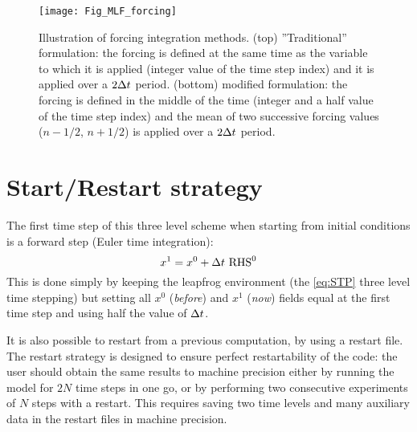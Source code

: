 \documentclass[../main/NEMO_manual]{subfiles}
\begin{document}
\begin{figure}[!t]
  \begin{center}
    \texttt{[image: Fig\_MLF\_forcing]}
    \caption{
      \protect\label{fig:MLF_forcing}
      Illustration of forcing integration methods.
      (top) ''Traditional'' formulation:
      the forcing is defined at the same time as the variable to which it is applied
      (integer value of the time step index) and it is applied over a $2 \Delta t$ period.
      (bottom)  modified formulation:
      the forcing is defined in the middle of the time (integer and a half value of the time step index) and
      the mean of two successive forcing values ($n - 1 / 2$, $n + 1 / 2$) is applied over a $2 \Delta t$ period.
    }
  \end{center}
\end{figure}

\section{Start/Restart strategy}
\label{sec:STP_rst}


The first time step of this three level scheme when starting from initial conditions is a forward step
(Euler time integration):
\[
  x^1 = x^0 + \Delta t \ \text{RHS}^0
\]
This is done simply by keeping the leapfrog environment (\ie the \autoref{eq:STP} three level time stepping) but
setting all $x^0$ (\textit{before}) and $x^1$ (\textit{now}) fields equal at the first time step and
using half the value of $\Delta t$.

It is also possible to restart from a previous computation, by using a restart file.
The restart strategy is designed to ensure perfect restartability of the code:
the user should obtain the same results to machine precision either by
running the model for $2N$ time steps in one go,
or by performing two consecutive experiments of $N$ steps with a restart.
This requires saving two time levels and many auxiliary data in the restart files in machine precision.
\end{document}
